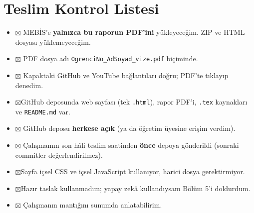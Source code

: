 \documentclass[12pt,a4paper]{article}
\begin{document}
\section{Teslim Kontrol Listesi}
\begin{itemize}[label={}]
  \item $\boxtimes$ MEBİS'e \textbf{yalnızca bu raporun PDF'ini} yükleyeceğim. ZIP ve HTML dosyası yüklemeyeceğim.
  \item $\boxtimes$ PDF dosya adı \texttt{OgrenciNo\_AdSoyad\_vize.pdf} biçiminde.
  \item $\boxtimes$ Kapaktaki GitHub ve YouTube bağlantıları doğru; PDF'te tıklayıp denedim.
  \item $\boxtimes$GitHub deposunda web sayfası (tek \texttt{.html}), rapor PDF'i, \texttt{.tex} kaynakları ve \texttt{README.md} var.
  \item $\boxtimes$ GitHub deposu \textbf{herkese açık} (ya da öğretim üyesine erişim verdim).
  \item $\boxtimes$ Çalışmamın son hâli teslim saatinden \textbf{önce} depoya gönderildi (sonraki commitler değerlendirilmez).
  \item $\boxtimes$Sayfa içsel CSS ve içsel JavaScript kullanıyor, harici dosya gerektirmiyor.
  \item $\boxtimes$Hazır taslak kullanmadım; yapay zekâ kullandıysam Bölüm 5'i doldurdum.
  \item $\boxtimes$ Çalışmanın mantığını sunumda anlatabilirim.
\end{itemize}
\end{document}
